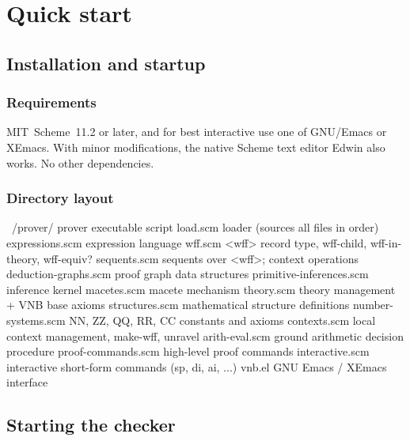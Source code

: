 \documentclass{amsbook}[openany]
\theoremstyle{definition}
\theoremstyle{remark}
\theoremstyle{remark}
\begin{document}

\section{Quick start}
\label{sec:quickstart-chap}

\subsection{Installation and startup}

\subsubsection{Requirements}

MIT~Scheme~11.2 or later, and for best interactive use one of
GNU/Emacs or XEmacs.  With minor modifications, the native Scheme text
editor Edwin also works.  No other dependencies.

\subsubsection{Directory layout}

\begin{VNBsnip}
~/prover/
  prover                 executable script
  load.scm               loader (sources all files in order)
  expressions.scm        expression language
  wff.scm                <wff> record type, wff-child, wff-in-theory, wff-equiv?
  sequents.scm           sequents over <wff>; context operations
  deduction-graphs.scm   proof graph data structures
  primitive-inferences.scm  inference kernel
  macetes.scm            macete mechanism
  theory.scm             theory management + VNB base axioms
  structures.scm         mathematical structure definitions
  number-systems.scm     NN, ZZ, QQ, RR, CC constants and axioms
  contexts.scm           local context management, make-wff, unravel
  arith-eval.scm         ground arithmetic decision procedure
  proof-commands.scm     high-level proof commands
  interactive.scm        interactive short-form commands (sp, di, ai, ...)
  vnb.el                 GNU Emacs / XEmacs interface
\end{VNBsnip}

\subsection{Starting the checker}
\end{document}
